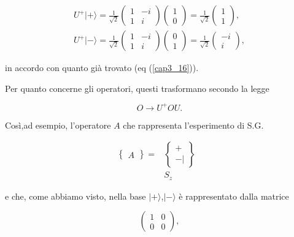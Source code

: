 \documentclass[a4paper,12pt,oneside]{book}
\begin{document}
\begin{equation}
\begin{array}{r}
U^+| + \rangle =\frac{1}{\sqrt{2}}
\begin{pmatrix}
1 & -i\\
1 & i
\end{pmatrix}
\begin{pmatrix}
1\\
0
\end{pmatrix}=
\frac{1}{\sqrt{2}}
\begin{pmatrix}
1\\
1
\end{pmatrix} ,\\
U^+| - \rangle =\frac{1}{\sqrt{2}}
\begin{pmatrix}
1 & -i\\
1 & i
\end{pmatrix}
\begin{pmatrix}
0\\
1
\end{pmatrix}=
\frac{1}{\sqrt{2}}
\begin{pmatrix}
-i\\
i
\end{pmatrix} ,
\end{array}
\end{equation}

in accordo con quanto già trovato (eq (\ref{cap3_16})).

Per quanto concerne gli operatori, questi trasformano secondo la legge

\begin{equation}
O \rightarrow U^+OU .
\end{equation}

Così,ad esempio, l'operatore $A$ che rappresenta l'esperimento di S.G.

\begin{eqnarray}
\begin{Bmatrix}
 A
\end{Bmatrix}
=
&\begin{Bmatrix}
 +  \\ - |  
\end{Bmatrix}& \\
&S_z&
\end{eqnarray}

e che, come abbiamo visto, nella base $| + \rangle $,$| - \rangle $ è rappresentato dalla matrice

\begin{equation}
\begin{pmatrix}
1 & 0\\
0 & 0
\end{pmatrix} ,
\end{equation}
\end{document}
